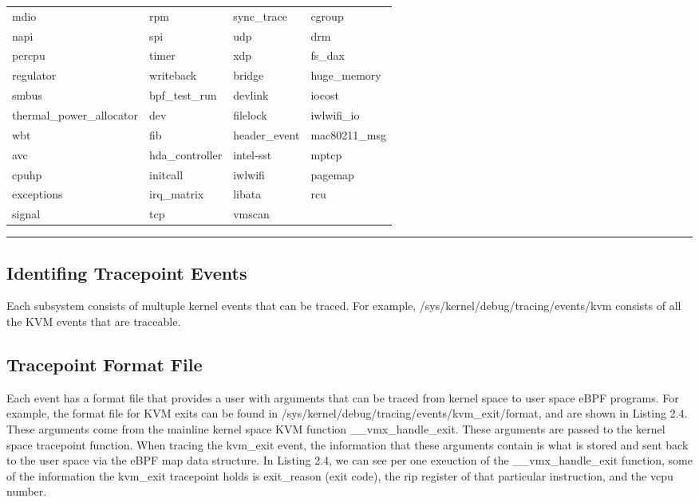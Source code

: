 \documentclass{report}
\begin{document}
\begin{spacing}{1.5}
{\begin{longtable}{llll}
mdio                        & rpm              & sync\_trace       & cgroup \\
napi                        & spi              & udp              & drm \\
percpu                      & timer            & xdp              & fs\_dax \\
regulator                   & writeback        & bridge           & huge\_memory \\
smbus                       & bpf\_test\_run     & devlink          & iocost \\
thermal\_power\_allocator     & dev              & filelock         & iwlwifi\_io \\ 
wbt                         & fib              & header\_event     & mac80211\_msg \\
avc                         & hda\_controller   & intel-sst        & mptcp \\
cpuhp                       & initcall         & iwlwifi          & pagemap \\
exceptions                  & irq\_matrix       & libata           & rcu \\
signal                      & tcp              & vmscan \\
\end{longtable}
\noindent\rule{15.5cm}{0.4pt}
\leavevmode\newline
}

\subsection{Identifing Tracepoint Events}

{\large
Each subsystem consists of multuple kernel events that can be traced. For example, /sys/kernel/debug/tracing/events/kvm consists of all the KVM events that are traceable.
\newline
}

\subsection{Tracepoint Format File}

{\large
Each event has a format file that provides a user with arguments that can be traced from kernel space to user space eBPF programs. For example, the format file for KVM exits can be found in /sys/kernel/debug/tracing/events/kvm\_exit/format, and are shown in Listing 2.4. These arguments come from the mainline kernel space KVM function \_\_vmx\_handle\_exit. These arguments are passed to the kernel space tracepoint function. When tracing the kvm\_exit event, the information that these arguments contain is what is stored and sent back to the user space via the eBPF map data structure. In Listing 2.4, we can see per one exeuction of the \_\_vmx\_handle\_exit function, some of the information the kvm\_exit tracepoint holds is exit\_reason (exit code), the rip register of that particular instruction, and the vcpu number.
\newline


}
\end{spacing}
\end{document}

